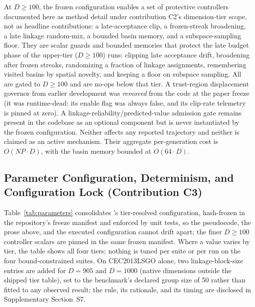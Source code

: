 At $D\ge100$, the frozen configuration enables a set of protective
controllers documented here as method detail under contribution C2's
dimension-tier scope, not as headline contributions: a late-acceptance
clip, a frozen-streak broadening, a late linkage random-mix, a bounded
basin memory, and a subspace-sampling floor. %
They are scalar guards and bounded memories that protect the late
budget phase of the upper-tier ($D{\ge}100$) runs: clipping late acceptance
drift, broadening after frozen streaks, randomizing a fraction of
linkage assignments, remembering visited basins by spatial novelty, and
keeping a floor on subspace sampling. All are gated to
$D\ge100$ and are no-ops below that tier.
A trust-region displacement governor from earlier development was
\emph{removed} from the code at the paper freeze (it was runtime-dead: its
enable flag was always false, and its clip-rate telemetry is pinned at zero).
A linkage-reliability/predicted-value admission gate remains present in the
codebase as an optional component but is never instantiated by the frozen
configuration. Neither affects any reported trajectory and neither is claimed
as an active mechanism.
Their aggregate per-generation cost is $O(NP\cdot D)$, with the basin
memory bounded at $O(64\cdot D)$. %

\subsection{Parameter Configuration, Determinism, and Configuration Lock (Contribution C3)}\label{sec:alg:profile}

Table~\ref{tab:parameters} consolidates \dtgsk{}'s tier-resolved
configuration, hash-frozen in the repository's freeze manifest and
enforced by unit tests, so the pseudocode, the prose above, and the
executed configuration cannot drift apart; the finer $D\ge100$
controller scalars are pinned in the same frozen manifest.
Where a value varies by tier, the table shows all four tiers; nothing
is tuned per suite or per run on the four bound-constrained suites. On
CEC2013LSGO alone, two linkage-block-size entries are added for
$D = 905$ and $D = 1000$ (native dimensions outside the shipped tier
table), set to the benchmark's declared group size of 50 rather than
fitted to any observed result; the rule, its rationale, and its timing
are disclosed in Supplementary Section~S7.

